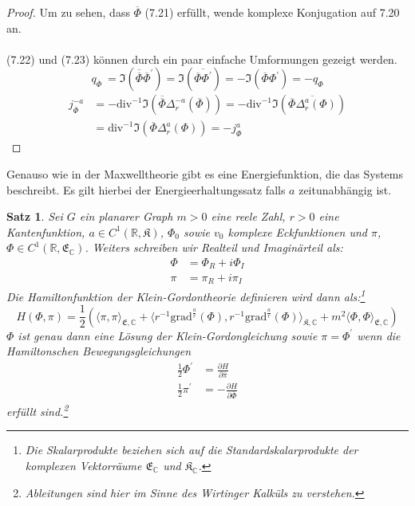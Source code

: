 \documentclass[11pt,a4paper,leqno]{report}
\newtheorem{proposition}{Satz}[chapter]
\numberwithin{equation}{chapter}
\begin{document}
\begin{proof}
	Um zu sehen, dass $\overline{\Phi}$ (7.21) erf\"ullt, wende komplexe Konjugation auf 7.20 an.\\
	\\
	(7.22) und (7.23) k\"onnen durch ein paar einfache Umformungen gezeigt werden.
	\begin{equation*}
		q_{\overline{\Phi}}\ = \Im(\overline{\overline{\Phi}}\overline{\Phi}^\prime)
		= \Im(\overline{\overline{\Phi}\Phi^\prime}) = -\Im(\overline{\Phi}\Phi^\prime)
		= -q_\Phi
	\end{equation*}
	\begin{align*}
		j_{\overline{\Phi}}^{-a} &= -\text{div}^{-1}\Im(\overline{\overline{\Phi}}\Delta^{-a}_r(\overline{\Phi}))
		= -\text{div}^{-1}\Im(\overline{\overline{\Phi}\Delta^a_r(\Phi)})\\
		&= \text{div}^{-1}\Im(\overline{\Phi}\Delta^a_r(\Phi))= -j_{\Phi}^a
	\end{align*}
\end{proof}
\noindent
Genauso wie in der Maxwelltheorie gibt es eine Energiefunktion, die das Systems beschreibt. Es gilt hierbei der Energieerhaltungssatz falls $a$ zeitunabh\"angig ist.
\begin{proposition}
	Sei $G$ ein planarer Graph $m>0$ eine reele Zahl, $r>0$ eine Kantenfunktion, $a\in C^1(\mathbb{R}, \mathfrak{K})$, $\Phi_0$ sowie $v_0$ komplexe Eckfunktionen und $\pi$, $\Phi\in C^1(\mathbb{R}, \mathfrak{E}_\mathbb{C})$. Weiters schreiben wir Realteil und Imagin\"arteil als:
	\begin{align}
		\Phi &= \Phi_R + i\Phi_I\\
	     \pi &= \pi_R + i\pi_I
	\end{align}
	Die Hamiltonfunktion der Klein-Gordontheorie definieren wird dann als:\footnote{Die Skalarprodukte beziehen sich auf die Standardskalarprodukte der komplexen Vektorr\"aume $\mathfrak{E}_\mathbb{C}$ und $\mathfrak{K}_\mathbb{C}$.}
	\begin{equation}
	H(\Phi, \pi) = \frac{1}{2}(\langle \pi, \pi\rangle_{\mathfrak{E},\mathbb{C}}+\langle r^{-1}\text{grad}^{\frac{a}{r}}(\Phi), r^{-1}\text{grad}^{\frac{a}{r}}(\Phi)\rangle_{\mathfrak{K},\mathbb{C}}+m^2\langle \Phi,\Phi\rangle_{\mathfrak{E},\mathbb{C}})
	\end{equation}	
	 $\Phi$ ist genau dann eine L\"osung der Klein-Gordongleichung sowie $\pi=\Phi^\prime$ wenn die Hamiltonschen Bewegungsgleichungen
	\begin{align}
		\frac{1}{2}\Phi^\prime &= \frac{\partial H}{\partial \overline{\pi}}\\
		\frac{1}{2}\pi^\prime &= - \frac{\partial H}{\partial \overline{\Phi}}
	\end{align} erf\"ullt sind.\footnote{Ableitungen sind hier im Sinne des Wirtinger Kalk\"uls zu verstehen.}
\end{proposition}
\end{document}
